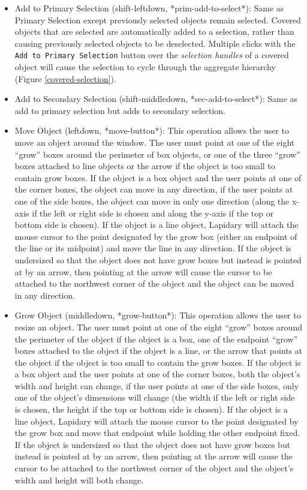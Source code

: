 \begin{itemize}
\item {}
Add to Primary Selection (shift-leftdown, *prim-add-to-select*): Same as
Primary Selection except previously selected objects remain selected.
Covered objects that are selected are
automatically added to a selection, rather than causing
previously selected objects to be deselected. Multiple clicks with
the {\tt Add to Primary Selection} button over the {\it selection handles}
of a covered object will cause the selection to cycle through the
aggregate hierarchy (Figure \ref{covered-selection}).

\item {}
Add to Secondary Selection (shift-middledown, *sec-add-to-select*): Same
as add to primary selection but adds to secondary selection.

\item {}
Move Object (leftdown, *move-button*): This operation allows
the user to move an
object around the window. The user must point at one of the eight ``grow''
boxes around the perimeter of box objects, or one of the three ``grow''
boxes attached to line objects or the arrow if the object is too
small to contain grow boxes. If the object is a box object
and the user points at one of
the corner boxes, the object can move in any direction, if the user points
at one of the side boxes, the object can move in only one direction (along
the x-axis if the left or right side is chosen and along the y-axis if the
top or bottom side is chosen). If the object is a line object, Lapidary will
attach the mouse cursor to the point designated by the grow box (either an
endpoint of the line or its midpoint) and move the line in any direction.
If the object is undersized so that the object does not have grow boxes but
instead is pointed at by an arrow, then pointing at the arrow will cause the
cursor to be attached to the northwest corner of the object and the object
can be moved in any direction.

\item {}
Grow Object (middledown, *grow-button*): This operation allows
the user to resize an
object. The user must point at one of the eight ``grow''
boxes around the perimeter of the object if the object is a box, one of
the endpoint ``grow'' boxes attached to the object if the object is a line,
or the arrow that points at the object if the object is too small to contain
the grow boxes. If the object is a box object and
the user points at one of
the corner boxes, both the object's width and height can change, if the
user points
at one of the side boxes, only one of the object's dimensions will change
(the width if the left or right side is chosen, the height if the top or
bottom side is chosen). If the object is a line object, Lapidary will
attach the mouse cursor to the point designated by the grow box and move
that endpoint while holding the other endpoint fixed.
If the object is undersized so that the object does not have grow boxes but
instead is pointed at by an arrow, then pointing at the arrow will cause the
cursor to be attached to the northwest corner of the object and the object's
width and height will both change.


\end{itemize}
